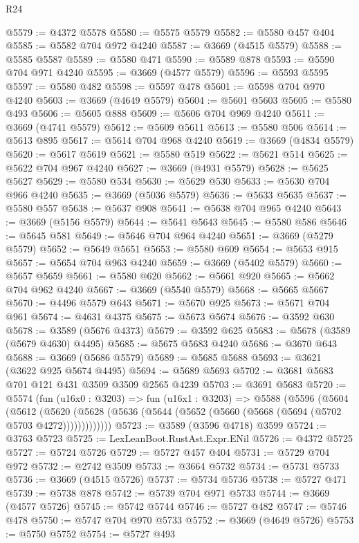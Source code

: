 \begin{lexlean}{R24}
\begin{coremodule}
@5579 := @4372 @5578
@5580 := @5575 @5579
@5582 := @5580 @457 @404
@5585 := @5582 @704 @972 @4240
@5587 := @3669 (@4515 @5579)
@5588 := @5585 @5587
@5589 := @5580 @471
@5590 := @5589 @878
@5593 := @5590 @704 @971 @4240
@5595 := @3669 (@4577 @5579)
@5596 := @5593 @5595
@5597 := @5580 @482
@5598 := @5597 @478
@5601 := @5598 @704 @970 @4240
@5603 := @3669 (@4649 @5579)
@5604 := @5601 @5603
@5605 := @5580 @493
@5606 := @5605 @888
@5609 := @5606 @704 @969 @4240
@5611 := @3669 (@4741 @5579)
@5612 := @5609 @5611
@5613 := @5580 @506
@5614 := @5613 @895
@5617 := @5614 @704 @968 @4240
@5619 := @3669 (@4834 @5579)
@5620 := @5617 @5619
@5621 := @5580 @519
@5622 := @5621 @514
@5625 := @5622 @704 @967 @4240
@5627 := @3669 (@4931 @5579)
@5628 := @5625 @5627
@5629 := @5580 @534
@5630 := @5629 @530
@5633 := @5630 @704 @966 @4240
@5635 := @3669 (@5036 @5579)
@5636 := @5633 @5635
@5637 := @5580 @557
@5638 := @5637 @908
@5641 := @5638 @704 @965 @4240
@5643 := @3669 (@5156 @5579)
@5644 := @5641 @5643
@5645 := @5580 @586
@5646 := @5645 @581
@5649 := @5646 @704 @964 @4240
@5651 := @3669 (@5279 @5579)
@5652 := @5649 @5651
@5653 := @5580 @609
@5654 := @5653 @915
@5657 := @5654 @704 @963 @4240
@5659 := @3669 (@5402 @5579)
@5660 := @5657 @5659
@5661 := @5580 @620
@5662 := @5661 @920
@5665 := @5662 @704 @962 @4240
@5667 := @3669 (@5540 @5579)
@5668 := @5665 @5667
@5670 := @4496 @5579 @643
@5671 := @5670 @925
@5673 := @5671 @704 @961
@5674 := @4631 @4375
@5675 := @5673 @5674
@5676 := @3592 @630
@5678 := @3589 (@5676 @4373)
@5679 := @3592 @625
@5683 := @5678 (@3589 (@5679 @4630) @4495)
@5685 := @5675 @5683 @4240
@5686 := @3670 @643
@5688 := @3669 (@5686 @5579)
@5689 := @5685 @5688
@5693 := @3621 (@3622 @925 @5674 @4495)
@5694 := @5689 @5693
@5702 := @3681 @5683 @701 @121 @431 @3509 @3509 @2565 @4239
@5703 := @3691 @5683
@5720 := @5574
    (fun (u16x0 : @3203) =>
    fun (u16x1 : @3203) =>
    @5588
      (@5596
        (@5604
          (@5612
            (@5620 (@5628 (@5636 (@5644 (@5652 (@5660 (@5668 (@5694 (@5702 @5703 @4272)))))))))))))
@5723 := @3589 (@3596 @4718) @3599
@5724 := @3763 @5723
@5725 := LexLeanBoot.RustAst.Expr.ENil
@5726 := @4372 @5725
@5727 := @5724 @5726
@5729 := @5727 @457 @404
@5731 := @5729 @704 @972
@5732 := @2742 @3509
@5733 := @3664 @5732
@5734 := @5731 @5733
@5736 := @3669 (@4515 @5726)
@5737 := @5734 @5736
@5738 := @5727 @471
@5739 := @5738 @878
@5742 := @5739 @704 @971 @5733
@5744 := @3669 (@4577 @5726)
@5745 := @5742 @5744
@5746 := @5727 @482
@5747 := @5746 @478
@5750 := @5747 @704 @970 @5733
@5752 := @3669 (@4649 @5726)
@5753 := @5750 @5752
@5754 := @5727 @493

\end{coremodule}
\end{lexlean}

